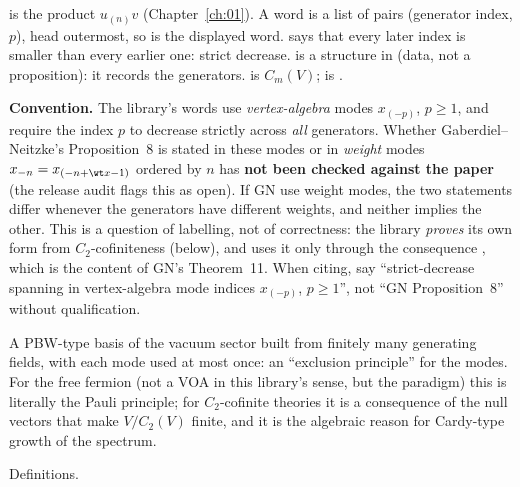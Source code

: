 \begin{dictionary}
 is the product $u_{(n)}v$ (Chapter~\ref{ch:01}). A word is a list of pairs (generator index, $p$),
head outermost, so  is the displayed word.  says
that every later index is smaller than every earlier one: strict decrease.  is a structure in
 (data, not a proposition): it records the generators.  is $C_m(V)$;  is
.

\textbf{Convention.} The library's words use \emph{vertex-algebra} modes $x_{(-p)}$, $p\ge1$, and require the index $p$
to decrease strictly across \emph{all} generators. Whether Gaberdiel--Neitzke's Proposition~8 is stated in these modes or
in \emph{weight} modes $x_{-n}=x_{(-n+\wt x-1)}$ ordered by $n$ has \textbf{not been checked against the paper} (the release
audit flags this as open). If GN use weight modes, the two statements differ whenever the generators have different
weights, and neither implies the other. This is a question of labelling, not of correctness: the library \emph{proves}
its own form from $C_2$-cofiniteness (below), and uses it only through the consequence
\allowbreak{}, which is the content of GN's Theorem~11. When citing, say
``strict-decrease spanning in vertex-algebra mode indices $x_{(-p)}$, $p\ge1$'', not ``GN Proposition~8'' without
qualification.
\end{dictionary}

\begin{physics}
A PBW-type basis of the vacuum sector built from finitely many generating fields, with each mode used at most once: an
``exclusion principle'' for the modes. For the free fermion (not a VOA in this library's sense, but the paradigm) this is
literally the Pauli principle; for $C_2$-cofinite theories it is a consequence of the null vectors that make $V/C_2(V)$
finite, and it is the algebraic reason for Cardy-type growth of the spectrum.
\end{physics}

\begin{status}
Definitions.
\end{status}

